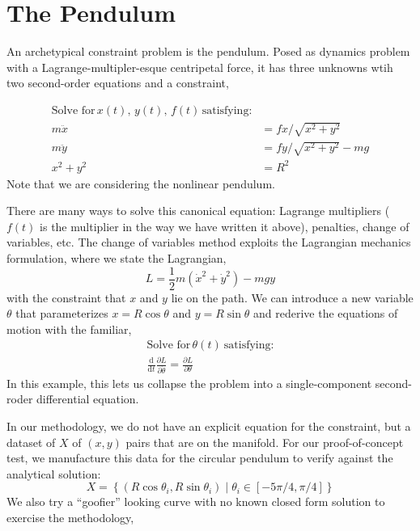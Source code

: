 \documentclass[]{article}
\begin{document}
\hypertarget{header-n3267}{%
\section{The Pendulum}\label{header-n3267}}

An archetypical constraint problem is the pendulum. Posed as dynamics
problem with a Lagrange-multipler-esque centripetal force, it
has three unknowns wtih two second-order equations and a constraint,

\begin{align}
\text{Solve for}\, x(t), \, y(t), \, f(t) \, \text{satisfying:} \\
m \ddot{x} & = f x/\sqrt{x^2+y^2} \\
m \ddot{y} & = f y/\sqrt{x^2+y^2} - m g \\
x^2 + y^2 & = R^2
\end{align}
Note that we are considering the nonlinear pendulum.

There are many ways to solve this canonical equation: Lagrange
multipliers (\(f(t)\) is the multiplier in the way we have written it
above), penalties, change of variables, etc. The change of variables
method exploits the Lagrangian mechanics formulation, where we state
the Lagrangian,
\begin{equation}
L = \frac{1}{2}m\left(\dot{x}^2 + \dot{y}^2\right) - m g y
\end{equation}
with the constraint that \(x\) and \(y\) lie on the path.
We can introduce a new variable \(\theta\) that parameterizes
\(x=R\cos\theta\) and \(y=R\sin\theta\) and rederive the equations of
motion with the familiar,
\begin{align}
\text{Solve for}\, \theta(t) \ \text{satisfying:} \\
\frac{\mathrm{d}}{\mathrm{d}t} \frac{\partial L}{\partial
  \dot{\theta}} =
  \frac{\partial L}{\partial \theta}
\end{align}
In this example, this lets us collapse the problem into a
single-component second-roder differential equation.

In our methodology, we do not have an explicit equation for the
constraint, but a dataset of $X$ of $(x,y)$ pairs that are on the manifold. For
our proof-of-concept test, we manufacture this data for the circular
pendulum to verify against the analytical solution:
\begin{equation}
X = \left\{ (R\cos\theta_i, R\sin\theta_i)\; | \;\theta_i \in [-5\pi/4,\pi/4] \right\}
\end{equation}
We also try a ``goofier'' looking curve with no known closed form
solution to exercise the methodology,
\end{document}
